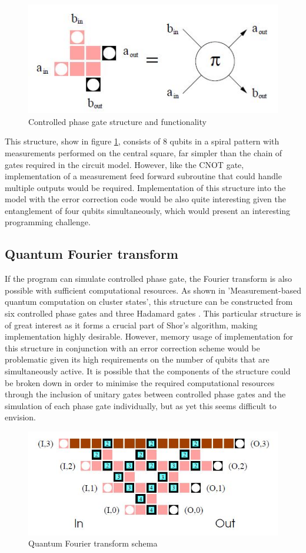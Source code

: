 \begin{figure}
\centering
\includegraphics[scale=0.9]{gfx/phasegate.JPG}
\caption{Controlled phase gate structure and functionality
 \citep{raussendorf_measurement-based_2003}}
\label{fig:phase_gate}
\end{figure}

This structure, show in figure \ref{fig:phase_gate}, consists of 8 qubits in a spiral pattern with measurements performed on the central square, far simpler than the chain of gates required in the circuit model. However, like the CNOT gate, implementation of a measurement feed forward subroutine that could handle multiple outputs would be required. Implementation of this structure into the model with the error correction code would be also quite interesting given the entanglement of four qubits simultaneously, which would present an interesting programming challenge.


\subsection{Quantum Fourier transform}

If the program can simulate controlled phase gate, the Fourier transform is also possible with sufficient computational resources. As shown in 'Measurement-based quantum computation on cluster states', this structure can be constructed from six controlled phase gates and three Hadamard gates \citep{raussendorf_measurement-based_2003}. This particular structure is of great interest as it forms a crucial part of Shor's algorithm, making implementation highly desirable. However, memory usage of implementation for this structure in conjunction with an error correction scheme would be problematic given its high requirements on the number of qubits that are simultaneously active. It is possible that the components of the structure could be broken down in order to minimise the required computational resources through the inclusion of unitary gates between controlled phase gates and the simulation of each phase gate individually, but as yet this seems difficult to envision.

\begin{figure}
\centering
\includegraphics[scale=0.75]{gfx/qft.JPG}
\caption{Quantum Fourier transform schema \citep{raussendorf_measurement-based_2003}}
\end{figure}